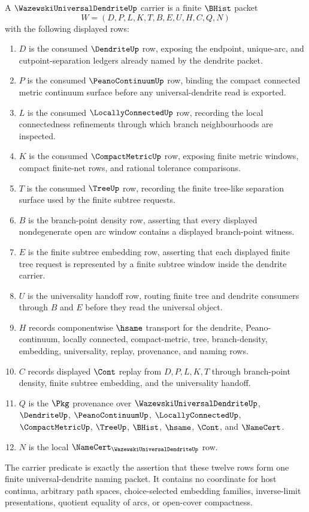 \begin{definition}
\label{def:wazewski-universal-dendrite-carrier}
A $\WazewskiUniversalDendriteUp$ carrier is a finite $\BHist$ packet
$$
W=(D,P,L,K,T,B,E,U,H,C,Q,N)
$$
with the following displayed rows:
\begin{enumerate}
\item $D$ is the consumed $\DendriteUp$ row, exposing the endpoint, unique-arc, and cutpoint-separation ledgers already named by the dendrite packet.
\item $P$ is the consumed $\PeanoContinuumUp$ row, binding the compact connected metric continuum surface before any universal-dendrite read is exported.
\item $L$ is the consumed $\LocallyConnectedUp$ row, recording the local connectedness refinements through which branch neighbourhoods are inspected.
\item $K$ is the consumed $\CompactMetricUp$ row, exposing finite metric windows, compact finite-net rows, and rational tolerance comparisons.
\item $T$ is the consumed $\TreeUp$ row, recording the finite tree-like separation surface used by the finite subtree requests.
\item $B$ is the branch-point density row, asserting that every displayed nondegenerate open arc window contains a displayed branch-point witness.
\item $E$ is the finite subtree embedding row, asserting that each displayed finite tree request is represented by a finite subtree window inside the dendrite carrier.
\item $U$ is the universality handoff row, routing finite tree and dendrite consumers through $B$ and $E$ before they read the universal object.
\item $H$ records componentwise $\hsame$ transport for the dendrite, Peano-continuum, locally connected, compact-metric, tree, branch-density, embedding, universality, replay, provenance, and naming rows.
\item $C$ records displayed $\Cont$ replay from $D,P,L,K,T$ through branch-point density, finite subtree embedding, and the universality handoff.
\item $Q$ is the $\Pkg$ provenance over $\WazewskiUniversalDendriteUp$, $\DendriteUp$, $\PeanoContinuumUp$, $\LocallyConnectedUp$, $\CompactMetricUp$, $\TreeUp$, $\BHist$, $\hsame$, $\Cont$, and $\NameCert$.
\item $N$ is the local $\NameCert_{\WazewskiUniversalDendriteUp}$ row.
\end{enumerate}
The carrier predicate is exactly the assertion that these twelve rows form one finite universal-dendrite naming packet. It contains no coordinate for host continua, arbitrary path spaces, choice-selected embedding families, inverse-limit presentations, quotient equality of arcs, or open-cover compactness.
\end{definition}

